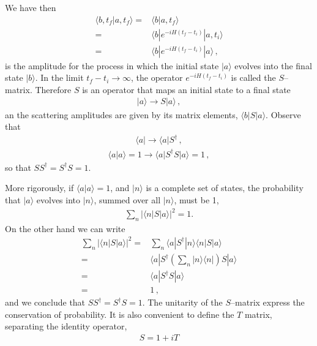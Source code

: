 We have then
\begin{align}
  \langle b,t_f|a,t_f\rangle=& \langle b|a,t_f\rangle\nonumber\\
=& \langle b|e^{-i H(t_f-t_i)}|a,t_i\rangle\nonumber\\
=& \langle b|e^{-i H(t_f-t_i)}|a\rangle\,,
\end{align}
is the amplitude for the process in which the initial state $|a\rangle$ evolves into the final state $|b\rangle$. In the limit $t_f-t_i\to\infty$, the operator  $e^{-i H(t_f-t_i)}$ is called the $S$--matrix. Therefore $S$ is an operator that maps an initial state to a final state
\begin{align}
  |a\rangle\to S|a\rangle\,,
\end{align}
an the scattering amplitudes are given by its matrix elements, $\langle b|S|a\rangle$. Observe that
\begin{align}
  \langle a|\to \langle a|S^\dagger\,,
\end{align}
\begin{align}
  \label{eq:40}
  \langle a|a\rangle=1\to \langle a|S^\dagger S|a\rangle=1\,,
\end{align}
so that $S S^\dagger=S^\dagger S =1$.

More rigorously, if $\langle a|a\rangle=1$, and $|n\rangle$ is a complete set of states, the probability that $|a\rangle$ evolves into $|n\rangle$, summed over all $|n\rangle$, must be 1,
\begin{align}
  \sum_n\left|\langle n|S|a\rangle\right|^2=1.
\end{align}
On the other hand we can write
\begin{align}
  \sum_n\left|\langle n|S|a\rangle\right|^2=&\sum_n\langle a|S^\dagger|n\rangle\langle n|S|a\rangle\nonumber\\
  =&\langle a|S^\dagger\left(\sum_n|n\rangle\langle n|\right)S|a\rangle\nonumber\\
  =&\langle a|S^\dagger S|a\rangle\nonumber\\
  =&1\,,
\end{align}
and we conclude that  $S S^\dagger=S^\dagger S =1$. The unitarity of the $S$--matrix express the conservation of probability. It is also convenient to define the $T$ matrix, separating the identity operator,
\begin{align}
  S=1+i T
\end{align}

